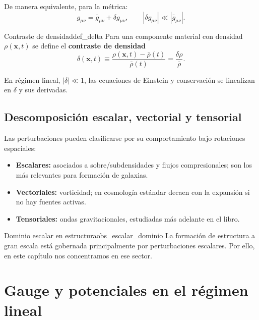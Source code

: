 De manera equivalente, para la métrica:
\begin{equation}
g_{\mu\nu}=\bar g_{\mu\nu}+\delta g_{\mu\nu},
\qquad
\left|\delta g_{\mu\nu}\right|\ll\left|\bar g_{\mu\nu}\right|.
\end{equation}

\begin{definicion}{Contraste de densidad}{def_delta}
Para una componente material con densidad $\rho(\mathbf{x},t)$ se define el \textbf{contraste de densidad}
\begin{equation}
\delta(\mathbf{x},t)\equiv\frac{\rho(\mathbf{x},t)-\bar\rho(t)}{\bar\rho(t)}=\frac{\delta\rho}{\bar\rho}.
\end{equation}
\end{definicion}

En régimen lineal, $|\delta|\ll1$, las ecuaciones de Einstein y conservación se linealizan en $\delta$ y sus derivadas.

\subsection{Descomposición escalar, vectorial y tensorial}

Las perturbaciones pueden clasificarse por su comportamiento bajo rotaciones espaciales:
\begin{itemize}[leftmargin=2em]
  \item \textbf{Escalares:} asociados a sobre/subdensidades y flujos compresionales; son los más relevantes para formación de galaxias.
  \item \textbf{Vectoriales:} vorticidad; en cosmología estándar decaen con la expansión si no hay fuentes activas.
  \item \textbf{Tensoriales:} ondas gravitacionales, estudiadas más adelante en el libro.
\end{itemize}

\begin{observacion}{Dominio escalar en estructura}{obs_escalar_dominio}
La formación de estructura a gran escala está gobernada principalmente por perturbaciones escalares. Por ello, en este capítulo nos concentramos en ese sector.
\end{observacion}

\section{Gauge y potenciales en el régimen lineal}
\label{sec:gauge_potenciales}

